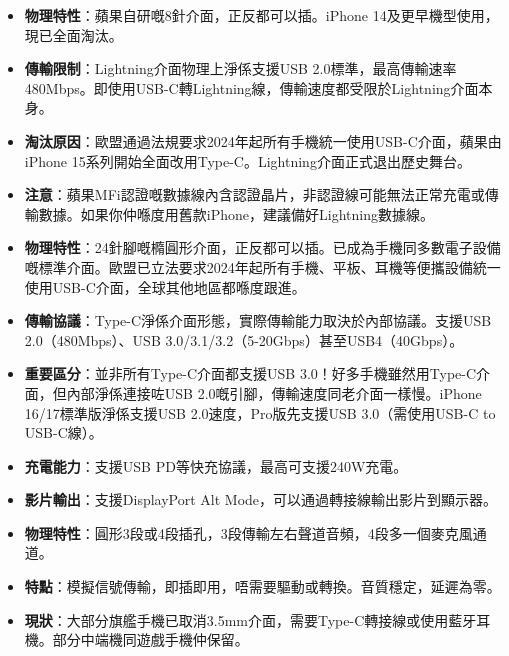 
\begin{itemize}
  \item \textbf{物理特性}：蘋果自研嘅8針介面，正反都可以插。iPhone 14及更早機型使用，現已全面淘汰。
  \item \textbf{傳輸限制}：Lightning介面物理上淨係支援USB 2.0標準，最高傳輸速率480Mbps。即使用USB-C轉Lightning線，傳輸速度都受限於Lightning介面本身。
  \item \textbf{淘汰原因}：歐盟通過法規要求2024年起所有手機統一使用USB-C介面，蘋果由iPhone 15系列開始全面改用Type-C。Lightning介面正式退出歷史舞台。
  \item \textbf{注意}：蘋果MFi認證嘅數據線內含認證晶片，非認證線可能無法正常充電或傳輸數據。如果你仲喺度用舊款iPhone，建議備好Lightning數據線。
\end{itemize}


\begin{itemize}
  \item \textbf{物理特性}：24針腳嘅橢圓形介面，正反都可以插。已成為手機同多數電子設備嘅標準介面。歐盟已立法要求2024年起所有手機、平板、耳機等便攜設備統一使用USB-C介面，全球其他地區都喺度跟進。
  \item \textbf{傳輸協議}：Type-C淨係介面形態，實際傳輸能力取決於內部協議。支援USB 2.0（480Mbps）、USB 3.0/3.1/3.2（5-20Gbps）甚至USB4（40Gbps）。
  \item \textbf{重要區分}：並非所有Type-C介面都支援USB 3.0！好多手機雖然用Type-C介面，但內部淨係連接咗USB 2.0嘅引腳，傳輸速度同老介面一樣慢。iPhone 16/17標準版淨係支援USB 2.0速度，Pro版先支援USB 3.0（需使用USB-C to USB-C線）。
  \item \textbf{充電能力}：支援USB PD等快充協議，最高可支援240W充電。
  \item \textbf{影片輸出}：支援DisplayPort Alt Mode，可以通過轉接線輸出影片到顯示器。
\end{itemize}


\begin{itemize}
  \item \textbf{物理特性}：圓形3段或4段插孔，3段傳輸左右聲道音頻，4段多一個麥克風通道。
  \item \textbf{特點}：模擬信號傳輸，即插即用，唔需要驅動或轉換。音質穩定，延遲為零。
  \item \textbf{現狀}：大部分旗艦手機已取消3.5mm介面，需要Type-C轉接線或使用藍牙耳機。部分中端機同遊戲手機仲保留。
\end{itemize}

